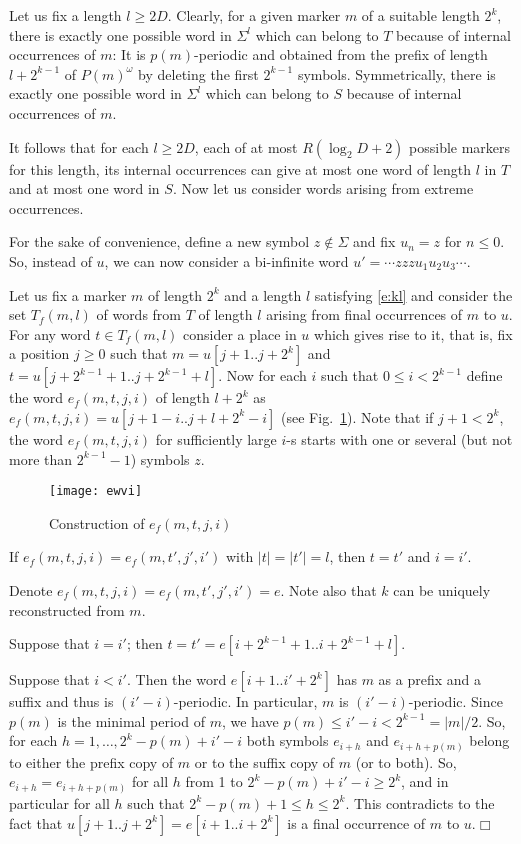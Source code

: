 \documentclass[runningheads,envcountsect,envcountsame]{llncs}
\begin{document}
Let us fix a length $l \geq 2 D$. Clearly, for a given marker $m$ of a suitable length $2^k$, there is exactly one possible word in $\Sigma^l$ which can belong to $T$ because of internal occurrences of $m$: It is $p(m)$-periodic and obtained from the prefix of length $l+2^{k-1}$ of $P(m)^{\omega}$
by deleting the first $2^{k-1}$ symbols. Symmetrically, there is exactly one possible word in $\Sigma^l$ which can belong to $S$ because of internal occurrences of $m$.


It follows that for each $l \geq 2 D$, each of at most $R(\log_2D+2)$ possible markers for this length, its internal occurrences can give at most one word of length $l$ in $T$ and at most one word in $S$. Now let us consider words arising from extreme occurrences.

For the sake of convenience, define a new symbol $z \notin \Sigma$ and fix $u_n=z$ for $n\leq 0$. So, instead of $u$, we can now consider a bi-infinite word $u'=\cdots zzzu_1u_2u_3\cdots$.

Let us fix a marker $m$ of length $2^k$ and a length $l$ satisfying \eqref{e:kl} and consider the set $T_f(m,l)$ of words from $T$ of length $l$ arising from final occurrences of $m$ to $u$. For any word $t \in T_f(m,l)$ consider a place in $u$ which gives rise to it, that is, fix a position $j\geq 0$ such that $m=u[j+1..j+2^k]$ and $t=u[j+2^{k-1}+1..j+2^{k-1}+l]$. Now for each $i$ such that $0\leq i<2^{k-1}$ define the word $e_f(m,t,j,i)$ of length $l+2^k$ as
$e_f(m,t,j,i)=u[j+1-i..j+l+2^k-i]$ (see Fig.~\ref{f:1}). Note that if $j+1<2^k$, the word $e_f(m,t,j,i)$ for sufficiently large $i$-s starts with one or several (but not more than $2^{k-1}-1$) symbols $z$.
\begin{center}
\begin{figure}
\centering \texttt{[image: ewvi]}
\caption{Construction of $e_f(m,t,j,i)$}\label{f:1}
\end{figure}
\end{center}

\begin{lemma}
 If $e_f(m,t,j,i)=e_f(m,t',j',i')$ with $|t|=|t'|=l$, then $t=t'$ and $i=i'$.
\end{lemma}
 Denote $e_f(m,t,j,i)=e_f(m,t',j',i')=e$. Note also that $k$ can be uniquely reconstructed from $m$.

Suppose that $i=i'$; then $t=t'=e[i+2^{k-1}+1..i+2^{k-1}+l]$.

Suppose that $i<i'$. Then the word $e[i+1..i'+2^k]$ has $m$ as a prefix and a suffix and thus is $(i'-i)$-periodic. In particular, $m$ is $(i'-i)$-periodic. Since $p(m)$ is the minimal period of $m$, we have $p(m)\leq i'-i <2^{k-1}=|m|/2$. So, for each $h=1,\ldots,2^k-p(m)+i'-i$ both symbols $e_{i+h}$ and $e_{i+h+p(m)}$ belong to either the prefix copy of $m$ or to the suffix copy of $m$ (or to both). So, $e_{i+h}=e_{i+h+p(m)}$ for all $h$ from 1 to $2^k-p(m)+i'-i\geq 2^k$, and in particular for all $h$ such that $2^k-p(m)+1 \leq h \leq 2^k$. This contradicts to the fact that $u[j+1..j+2^k]=e[i+1..i+2^k]$ is a final occurrence of $m$ to $u$.\hfill $\Box$
\end{document}

